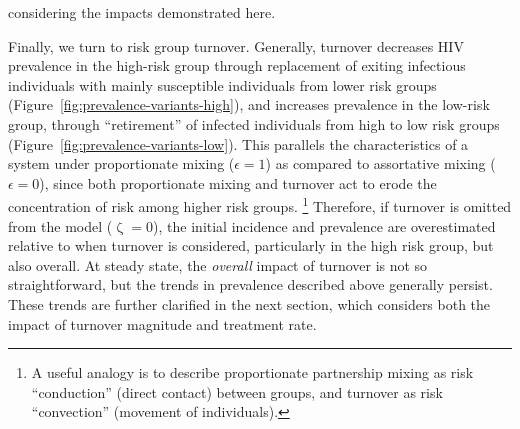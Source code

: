 \documentclass[10pt]{article}
\numberwithin{equation}{section}
\renewcommand{\zeta}{\upzeta}
\newcommand{\fig}[1]{Figure~\ref{#1}}
\begin{document}
considering the impacts demonstrated here.
\par
Finally, we turn to risk group turnover.
Generally, turnover decreases HIV prevalence in the high-risk group
through replacement of exiting infectious individuals
with mainly susceptible individuals from lower risk groups
(\fig{fig:prevalence-variants-high}),
and increases prevalence in the low-risk group,
through ``retirement'' of infected individuals from high to low risk groups
(\fig{fig:prevalence-variants-low}).
This parallels the characteristics of a system under proportionate mixing ($\epsilon = 1$)
as compared to assortative mixing ($\epsilon = 0$),
since both proportionate mixing and turnover
act to erode the concentration of risk among higher risk groups.%
\footnote{A useful analogy is to describe
  proportionate partnership mixing as risk ``conduction'' (direct contact) between groups,
  and turnover as risk ``convection'' (movement of individuals).}
Therefore, if turnover is omitted from the model ($\zeta = 0$),
the initial incidence and prevalence are overestimated relative to when turnover is considered,
particularly in the high risk group, but also overall.
At steady state, the \textit{overall} impact of turnover is not so straightforward,
but the trends in prevalence described above generally persist.
These trends are further clarified in the next section,
which considers both the impact of turnover magnitude and treatment rate.
\end{document}
